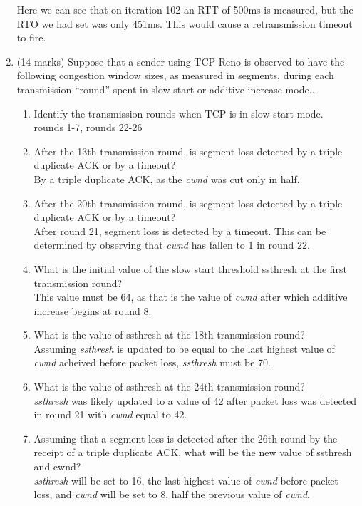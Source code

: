 \documentclass[10pt]{amsart}
\begin{document}
\begin{enumerate}
    Here we can see that on iteration 102 an RTT of 500ms is measured, but the
    RTO we had set was only 451ms.  This would cause a retransmission timeout to
    fire.

    \item (14 marks) Suppose that a sender using TCP Reno is observed to have
        the following congestion window sizes, as measured in segments, during
        each transmission “round” spent in slow start or additive increase
        mode...

        \begin{enumerate}
            \item Identify the transmission rounds when TCP is in slow start
                mode.\\
                rounds 1-7, rounds 22-26
            \item After the 13th transmission round, is segment loss detected by
                a triple duplicate ACK or by a timeout?\\
                By a triple duplicate ACK, as the \textit{cwnd} was cut only in
                half.
            \item After the 20th transmission round, is segment loss detected by
                a triple duplicate ACK or by a timeout?\\
                After round 21, segment loss is detected by a timeout.  This can
                be determined by observing that \textit{cwnd} has fallen to 1 in
                round 22.
            \item What is the initial value of the slow start threshold ssthresh
                at the first transmission round?\\
                This value must be 64, as that is the value of \textit{cwnd}
                after which additive increase begins at round 8.
            \item What is the value of ssthresh at the 18th transmission
                round?\\
                Assuming \textit{ssthresh} is updated to be equal to the last
                highest value of \textit{cwnd} acheived before packet loss,
                \textit{ssthresh} must be 70.
            \item What is the value of ssthresh at the 24th transmission
                round?\\
                \textit{ssthresh} was likely updated to a value of 42 after
                packet loss was detected in round 21 with \textit{cwnd} equal to
                42.
            \item Assuming that a segment loss is detected after the 26th round
                by the receipt of a triple duplicate ACK, what will be the new
                value of ssthresh and cwnd?\\
                \textit{ssthresh} will be set to 16, the last highest value of
                \textit{cwnd} before packet loss, and \textit{cwnd} will be set
                to 8, half the previous value of \textit{cwnd}.
        \end{enumerate}
    \end{enumerate}
\end{document}
